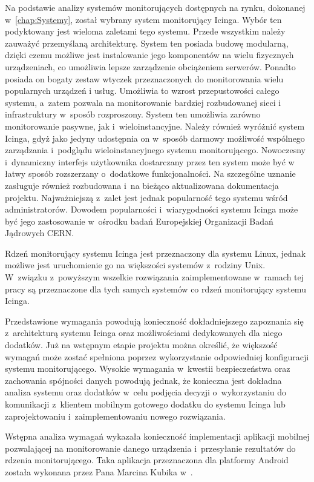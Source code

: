 Na podstawie analizy systemów monitorujących dostępnych na rynku,
dokonanej w~\ref{chap:Systemy}, został wybrany system monitorujący
Icinga. Wybór ten podyktowany jest wieloma zaletami tego
systemu. Przede wszystkim należy zauważyć przemyślaną
architekturę. System ten posiada budowę modularną, dzięki czemu
możliwe jest instalowanie jego komponentów na wielu fizycznych
urządzeniach, co umożliwia lepsze zarządzenie obciążeniem
serwerów. Ponadto posiada on bogaty zestaw wtyczek przeznaczonych do
monitorowania wielu popularnych urządzeń i usług. Umożliwia to wzrost
przepustowości całego systemu, a~zatem pozwala na monitorowanie
bardziej rozbudowanej sieci i infrastruktury w~sposób
rozproszony. System ten umożliwia zarówno monitorowanie pasywne, jak
i~wieloinstancyjne. Należy również wyróżnić system Icinga, gdyż jako
jedyny udostępnia on w~sposób darmowy możliwość wspólnego zarządzania
i~podglądu wieloinstancyjnego systemu monitorującego. Nowoczesny
i~dynamiczny interfejs użytkownika dostarczany przez ten system może
być w łatwy sposób rozszerzany o~dodatkowe funkcjonalności. Na
szczególne uznanie zasługuje również rozbudowana i~na bieżąco
aktualizowana dokumentacja projektu. Najważniejszą z~zalet jest jednak
popularność tego systemu wśród administratorów. Dowodem popularności
i~wiarygodności systemu Icinga może być jego zastosowanie w~ośrodku
badań Europejskiej Organizacji Badań Jądrowych
CERN\cite{www:IcingaCern}.

Rdzeń monitorujący systemu Icinga jest przeznaczony dla systemu Linux,
jednak możliwe jest uruchomienie go na większości systemów z~rodziny
Unix. W~związku z~powyższym wszelkie rozwiązania zaimplementowane
w~ramach tej pracy są przeznaczone dla tych samych systemów co rdzeń
monitorujący systemu Icinga.

Przedstawione wymagania powodują konieczność dokładniejszego
zapoznania się z~architekturą systemu Icinga oraz możliwościami
dedykowanych dla niego dodatków. Już na wstępnym etapie projektu można
określić, że większość wymagań może zostać spełniona poprzez
wykorzystanie odpowiedniej konfiguracji systemu
monitorującego. Wysokie wymagania w~kwestii bezpieczeństwa oraz
zachowania spójności danych powodują jednak, że konieczna jest
dokładna analiza systemu oraz dodatków w~celu podjęcia decyzji
o~wykorzystaniu do komunikacji z~klientem mobilnym gotowego dodatku do
systemu Icinga lub zaprojektowaniu i~zaimplementowaniu nowego
rozwiązania.

Wstępna analiza wymagań wykazała konieczność implementacji aplikacji
mobilnej pozwalającej na monitorowanie danego urządzenia i~przesyłanie
rezultatów do rdzenia monitorującego. Taka aplikacja przeznaczona dla
platformy Android została wykonana przez Pana Marcina Kubika
w~\cite{book:pracaKubika}.

